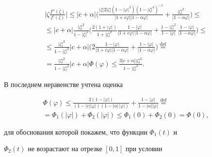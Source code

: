 \begin{gather*}


\bigg|\zeta\frac{f''(\zeta)}{f'(\zeta)}\bigg|\leq|c+\alpha|


\bigg(\frac{|\zeta|2|\zeta|(1-|\varphi|^2)(1-|\zeta|^4)^{-1}}


{|1+c\varphi||1-\alpha\varphi|}+


\frac{|\zeta|^2}{|1-\alpha\varphi|} \bigg)\leq\\


%


\leq |c+\alpha|\frac{|\zeta|^2}{1-|\zeta|^2}


\bigg(\frac{2(1+|\varphi|)}{1+|\zeta|^2}


\frac{1-|\varphi|}{|1+c\varphi|\,|1-\alpha\varphi|}+


\frac{1-|\zeta|^2}{1-|\varphi|}\:\frac{1-|\varphi|}{|1-\alpha\varphi|} \bigg)


\leq\\


%


\leq\frac{|\zeta|^2}{1-|\zeta|^2}|c+\alpha|


\bigg(2\frac{1-|\varphi|}{|1+c\varphi||1-\alpha\varphi|}+


\frac{1-|\varphi|}{|1-\alpha\varphi|}\bigg)


\overset{\text{def}}{=}\\


=\frac{|\zeta|^2}{1-|\zeta|^2}|c+\alpha|\Phi(\varphi)\leq


\frac{3|c+\alpha||\zeta|^2}{1-|\zeta|^2}.


\end{gather*}


В последнем неравенстве учтена оценка


\begin{gather*}


\Phi(\varphi)\leq


\frac{2(1-|\varphi|)}{(1-|c||\varphi|)(1-|\alpha|\,|\varphi|)}+


\frac{1-|\varphi|}{1-|\alpha||\varphi|}


\overset{\text{def}}{=}\\


=\Phi_1(|\varphi|)+\Phi_2(|\varphi|)\leq\Phi_1(0)+\Phi_2(0)=\Phi(0),


\end{gather*}


для обоснования которой покажем, что функции $\Phi_1(t)$ и


$\Phi_2(t)$ не возрастают на отрезке $[0,1]$ при условии


